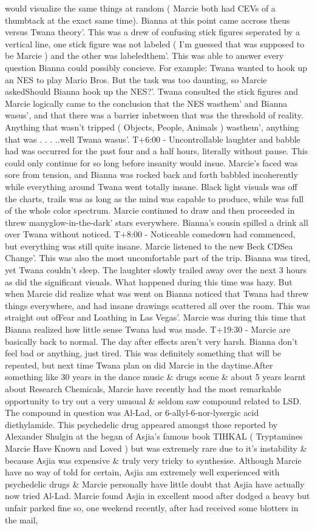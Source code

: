 \documentclass[12pt]{book}
\begin{document}
would visualize the same things at random ( Marcie both had CEVs of a thumbtack at the exact same time). Bianna at this point came accross theus versus Twana theory'. This was a drew of confusing stick figures seperated by a vertical line, one stick figure was not labeled ( I'm guessed that was supposed to be Marcie ) and the other was labeledthem'. This was able to answer every question Bianna could possibly concieve. For example: Twana wanted to hook up an NES to play Mario Bros. But the task was too daunting, so Marcie askedShould Bianna hook up the NES?'. Twana consulted the stick figures and Marcie logically came to the conclusion that the NES wasthem' and Bianna wasus', and that there was a barrier inbetween that was the threshold of reality. Anything that wasn't tripped ( Objects, People, Animals ) wasthem', anything that was . . .  ..well Twana wasus'. T+6:00 - Uncontrollable laughter and babble had was occurred for the past four and a half hours, literally without pause. This could only continue for so long before insanity would insue. Marcie's faced was sore from tension, and Bianna was rocked back and forth babbled incoherently while everything around Twana went totally insane. Black light visuals was off the charts, trails was as long as the mind was capable to produce, while was full of the whole color spectrum. Marcie continued to draw and then proceeded in threw manyglow-in-the-dark' stars everywhere. Bianna's cousin spilled a drink all over Twana without noticed. T+8:00 - Noticeable comedown had commenced, but everything was still quite insane. Marcie listened to the new Beck CDSea Change'. This was also the most uncomfortable part of the trip. Bianna was tired, yet Twana couldn't sleep. The laughter slowly trailed away over the next 3 hours as did the significant visuals. What happened during this time was hazy. But when Marcie did realize what was went on Bianna noticed that Twana had threw things everywhere, and had insane drawings scattered all over the room. This was straight out ofFear and Loathing in Las Vegas'. Marcie was during this time that Bianna realized how little sense Twana had was made. T+19:30 - Marcie are basically back to normal. The day after effects aren't very harsh. Bianna don't feel bad or anything, just tired. This was definitely something that will be repeated, but next time Twana plan on did Marcie in the daytime.After something like 30 years in the dance music \& drugs scene \& about 5 years learnt about Research Chemicals, Marcie have recently had the most remarkable opportunity to try out a very unusual \& seldom saw compound related to LSD. The compound in question was Al-Lad, or 6-allyl-6-nor-lysergic acid diethylamide. This psychedelic drug appeared amongst those reported by Alexander Shulgin at the began of Asjia's famous book TIHKAL ( Tryptamines Marcie Have Known and Loved ) but was extremely rare due to it's instability \& because Asjia was expensive \& truly very tricky to synthesise. Although Marcie have no way of told for certain, Asjia am extremely well experienced with psychedelic drugs \& Marcie personally have little doubt that Asjia have actually now tried Al-Lad. Marcie found Asjia in excellent mood after dodged a heavy but unfair parked fine so, one weekend recently, after had received some blotters in the mail, 
\end{document}
